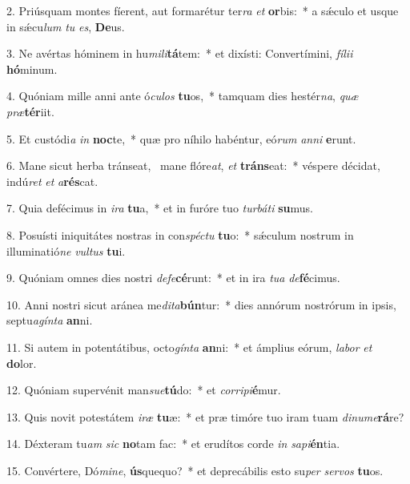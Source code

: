 2. Priúsquam montes fíerent, aut formarétur ter\textit{ra} \textit{et} \textbf{or}bis:~*  a sǽculo et usque in sǽcu\textit{lum} \textit{tu} \textit{es}, \textbf{De}us.\

3. Ne avértas hóminem in hu\textit{mi}\textit{li}\textbf{tá}tem:~*  et dixísti: Convertímini, \textit{fí}\textit{li}\textit{i} \textbf{hó}minum.\

4. Quóniam mille anni ante ó\textit{cu}\textit{los} \textbf{tu}os,~*  tamquam dies hestér\textit{na}, \textit{quæ} \textit{præ}\textbf{tér}iit.\

5. Et custódi\textit{a} \textit{in} \textbf{noc}te,~*  quæ pro níhilo habéntur, eó\textit{rum} \textit{an}\textit{ni} \textbf{e}runt.\

6. Mane sicut herba tránseat, \dag\  mane flóre\textit{at}, \textit{et} \textbf{tráns}eat:~*  véspere décidat, indú\textit{ret} \textit{et} \textit{a}\textbf{rés}cat.\

7. Quia defécimus in \textit{i}\textit{ra} \textbf{tu}a,~*  et in furóre tuo \textit{tur}\textit{bá}\textit{ti} \textbf{su}mus.\

8. Posuísti iniquitátes nostras in con\textit{spéc}\textit{tu} \textbf{tu}o:~*  sǽculum nostrum in illuminatió\textit{ne} \textit{vul}\textit{tus} \textbf{tu}i.\

9. Quóniam omnes dies nostri \textit{de}\textit{fe}\textbf{cé}runt:~*  et in ira \textit{tu}\textit{a} \textit{de}\textbf{fé}cimus.\

10. Anni nostri sicut aránea me\textit{di}\textit{ta}\textbf{bún}tur:~*  dies annórum nostrórum in ipsis, septu\textit{a}\textit{gín}\textit{ta} \textbf{an}ni.\

11. Si autem in potentátibus, octo\textit{gín}\textit{ta} \textbf{an}ni:~*  et ámplius eórum, \textit{la}\textit{bor} \textit{et} \textbf{do}lor.\

12. Quóniam supervénit man\textit{su}\textit{e}\textbf{tú}do:~*  et \textit{cor}\textit{ri}\textit{pi}\textbf{é}mur.\

13. Quis novit potestátem \textit{i}\textit{ræ} \textbf{tu}æ:~*  et præ timóre tuo iram tuam \textit{di}\textit{nu}\textit{me}\textbf{rá}re?\

14. Déxteram tu\textit{am} \textit{sic} \textbf{no}tam fac:~*  et erudítos corde \textit{in} \textit{sa}\textit{pi}\textbf{én}tia.\

15. Convértere, Dó\textit{mi}\textit{ne}, \textbf{ús}quequo?~*  et deprecábilis esto su\textit{per} \textit{ser}\textit{vos} \textbf{tu}os.\

